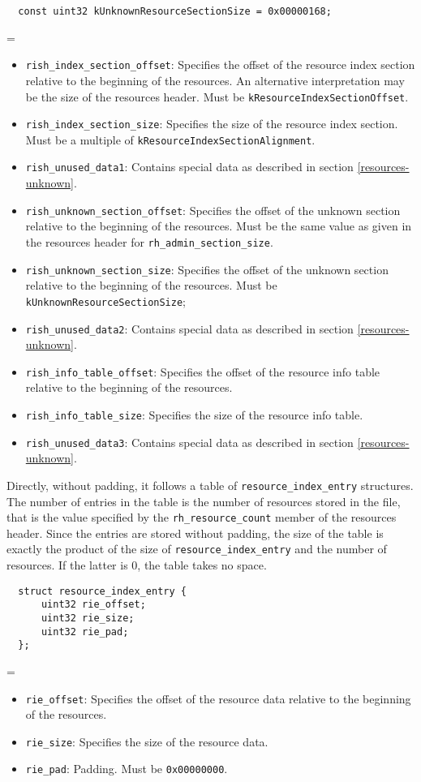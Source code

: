 \documentclass[12pt, a4paper]{article}
\newcommand{\code}[1]{{\tt #1}}
\newenvironment{nitemize}{
  \newdimen\oldparindent
  \oldparindent=\parindent
  \begin{itemize}
  \itemindent=-\oldparindent
}{
  \end{itemize}
}
\newcommand{\codeblockbegin}{\begin{flushleft}\begin{minipage}{\textwidth}}
\newcommand{\codeblockend}{\end{minipage}\end{flushleft}}
\begin{document}
\begin{verbatim}
  const uint32 kUnknownResourceSectionSize = 0x00000168;
\end{verbatim}
%
\begin{nitemize}
\item{\code{rish\_index\_section\_offset}:
  Specifies the offset of the resource index section relative to the beginning
  of the resources. An alternative interpretation may be the size of the
  resources header.
  Must be \code{kResourceIndexSectionOffset}.
}
\item{\code{rish\_index\_section\_size}:
  Specifies the size of the resource index section.
  Must be a multiple of \code{kResourceIndexSectionAlignment}.
}
\item{\code{rish\_unused\_data1}:
  Contains special data as described in section \ref{resources-unknown}.
}
\item{\code{rish\_unknown\_section\_offset}:
  Specifies the offset of the unknown section relative to the beginning
  of the resources.
  Must be the same value as given in the resources header for
  \code{rh\_admin\_section\_size}.
}
\item{\code{rish\_unknown\_section\_size}:
  Specifies the offset of the unknown section relative to the beginning
  of the resources.
  Must be \code{kUnknownResourceSectionSize};
}
\item{\code{rish\_unused\_data2}:
  Contains special data as described in section \ref{resources-unknown}.
}
\item{\code{rish\_info\_table\_offset}:
  Specifies the offset of the resource info table relative to the beginning
  of the resources.
}
\item{\code{rish\_info\_table\_size}:
  Specifies the size of the resource info table.
}
\item{\code{rish\_unused\_data3}:
  Contains special data as described in section \ref{resources-unknown}.
}
\end{nitemize}

Directly, without padding, it follows a table of \code{resource\_index\_entry}
structures. The number of entries in the table is the number of resources
stored in the file, that is the value specified by the
\code{rh\_resource\_count} member of the resources header. Since the entries
are stored without padding, the size of the table is exactly the product of
the size of \code{resource\_index\_entry} and the number of resources.
If the latter is 0, the table takes no space.
%
\codeblockbegin
\begin{verbatim}
  struct resource_index_entry {
      uint32 rie_offset;
      uint32 rie_size;
      uint32 rie_pad;
  };
\end{verbatim}
\codeblockend
%
\begin{nitemize}
\item{\code{rie\_offset}:
  Specifies the offset of the resource data relative to the beginning
  of the resources.
}
\item{\code{rie\_size}:
  Specifies the size of the resource data.
}
\item{\code{rie\_pad}:
	Padding. Must be \code{0x00000000}.
}
\end{nitemize}
\end{document}
